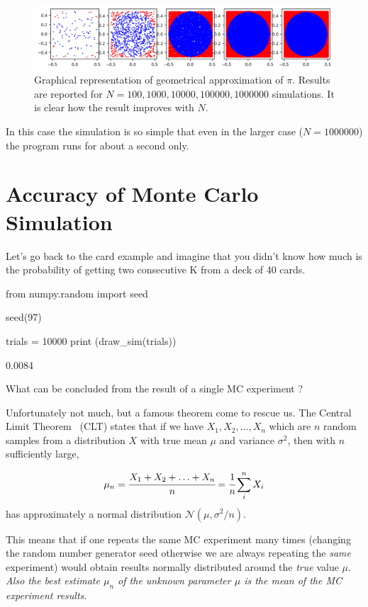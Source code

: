 \begin{figure}[htb]
\centering
\includegraphics[width=1\textwidth]{figures/mc_vs_n_experiments}
\caption{Graphical representation of geometrical approximation of $\pi$. Results are reported for $N = 100, 1000, 10000, 100000, 1000000$ simulations. It is clear how the result improves with $N$.}
\label{fig:circle_approx}
\end{figure}

In this case the simulation is so simple that even in the larger case ($N=1000000$) the program runs for about a second only.

\section{Accuracy of Monte Carlo Simulation}
\label{sec:confidence_interval}

Let's go back to the card example and imagine that you didn't know how much is the probability of getting two consecutive K from a deck of 40 cards. 
    
\begin{ipython}
from numpy.random import seed
  
seed(97)

trials = 10000
print (draw_sim(trials))
\end{ipython}
\begin{ioutput}
0.0084
\end{ioutput}

What can be concluded from the result of a single MC experiment ?

Unfortunately not much, but a famous theorem come to rescue us.
The Central Limit Theorem~\cite{bib:central_limit} (CLT) states that if we have $X_1, X_2,\dots, X_n$ which are $n$ random samples from a distribution $X$ with true mean $\mu$ and variance $\sigma^{2}$, then with $n$ sufficiently large,

\begin{equation*} 
\mu_n = \cfrac{X_1 + X_2 +\ldots + X_n}{n} = \cfrac{1}{n}\sum_i^n X_i
\end{equation*}
has approximately a normal distribution $\mathcal{N}(\mu, \sigma^2/n)$.

This means that if one repeats the same MC experiment many times (changing the random number generator seed otherwise we are always repeating the \emph{same} experiment) would obtain results normally distributed around the \emph{true} value $\mu$. \emph{Also the best estimate $\mu_n$ of the unknown parameter $\mu$ is the mean of the MC experiment results.}

